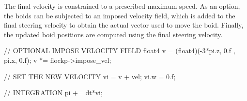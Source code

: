 The final velocity is constrained to a prescribed maximum speed. As an option, the boids can be subjected to an imposed velocity field, which is added to the final steering velocity to obtain the actual vector used to move the boid. Finally, the updated boid positions are computed using the final steering velocity.

\begin{cppcode}{0}
// OPTIONAL IMPOSE VELOCITY FIELD
float4 v = (float4)(-3*pi.z, 0.f , pi.x, 0.f);
v *= flockp->impose_vel;

// SET THE NEW VELOCITY
vi = v + vel;
vi.w = 0.f;

// INTEGRATION
pi += dt*vi; 
\end{cppcode}
 


